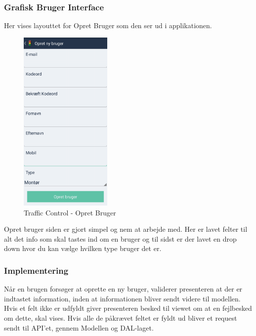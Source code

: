 	\pagebreak
	
	\subsubsection{Grafisk Bruger Interface}
	Her vises layouttet for Opret Bruger som den ser ud i applikationen.
	\begin{figure}[!ht]
		\begin{center}
			\includegraphics[height=9cm]{Android/Billeder/AndroidOpretbruger}
		\end{center}
		\caption{Traffic Control - Opret Bruger}
		\label{fig: Traffic Control - Opret Bruger}
	\end{figure}
	
	\noindent Opret bruger siden er gjort simpel og nem at arbejde med. Her er lavet felter til alt det info som skal tastes ind om en bruger og til sidst er der lavet en drop down hvor du kan vælge hvilken type bruger det er.	
	\subsubsection{Implementering}
	Når en brugen forsøger at oprette en ny bruger, validerer presenteren at der er indtastet information, inden at informationen bliver sendt videre til modellen. Hvis et felt ikke er udfyldt giver presenteren besked til viewet om at en fejlbesked om dette, skal vises. Hvis alle de påkrævet feltet er fyldt ud bliver et request sendt til API'et, gennem Modellen og DAL-laget.	
	\pagebreak